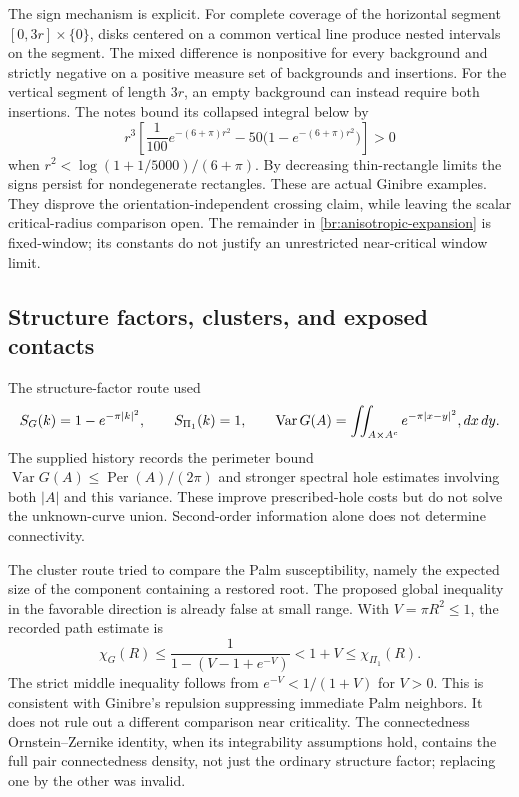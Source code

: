 \documentclass[11pt,a4paper]{article}
\theoremstyle{definition}
\theoremstyle{remark}
\numberwithin{equation}{section}
\begin{document}
The sign mechanism is explicit.  For complete coverage of the horizontal
segment $[0,3r]\times\{0\}$, disks centered on a common vertical line
produce nested intervals on the segment.  The mixed difference is
nonpositive for every background and strictly negative on a positive
measure set of backgrounds and insertions.  For the vertical segment of
length $3r$, an empty background can instead require both insertions.
The notes bound its collapsed integral below by
\[
 r^3\left[\frac1{100}e^{-(6+\pi)r^2}
       -50\bigl(1-e^{-(6+\pi)r^2}\bigr)\right]>0
\]
when $r^2<\log(1+1/5000)/(6+\pi)$.  By decreasing thin-rectangle
limits the signs persist for nondegenerate rectangles.  These are actual
Ginibre examples.  They disprove the orientation-independent crossing
claim, while leaving the scalar critical-radius comparison open.  The
remainder in \eqref{br:anisotropic-expansion} is fixed-window; its
constants do not justify an unrestricted near-critical window limit.

\subsection{Structure factors, clusters, and exposed contacts}
\label{br:local-observables}

The structure-factor route used
\[
 S_G(k)=1-e^{-\pi|k|^2},\qquad S_{\Pi_1}(k)=1,
 \qquad
 \operatorname{Var}G(A)
 =\iint_{A\times A^c}e^{-\pi|x-y|^2}\\,dx\,dy.
\]
The supplied history records the perimeter bound
$\operatorname{Var}G(A)\leq\operatorname{Per}(A)/(2\pi)$ and stronger
spectral hole estimates involving both $|A|$ and this variance.  These
improve prescribed-hole costs but do not solve the unknown-curve union.
Second-order information alone does not determine connectivity.

The cluster route tried to compare the Palm susceptibility, namely the
expected size of the component containing a restored root.  The proposed
global inequality in the favorable direction is already false at small
range.  With $V=\pi R^2\leq1$, the recorded path estimate is
\[
 \chi_G(R)\leq
 \frac{1}{1-(V-1+e^{-V})}<1+V\leq\chi_{\Pi_1}(R).
\]
The strict middle inequality follows from $e^{-V}<1/(1+V)$ for $V>0$.
This is consistent with Ginibre's repulsion suppressing immediate Palm
neighbors.  It does not rule out a different comparison near criticality.
The connectedness Ornstein--Zernike identity, when its integrability
assumptions hold, contains the full pair connectedness density, not just
the ordinary structure factor; replacing one by the other was invalid.
\end{document}
